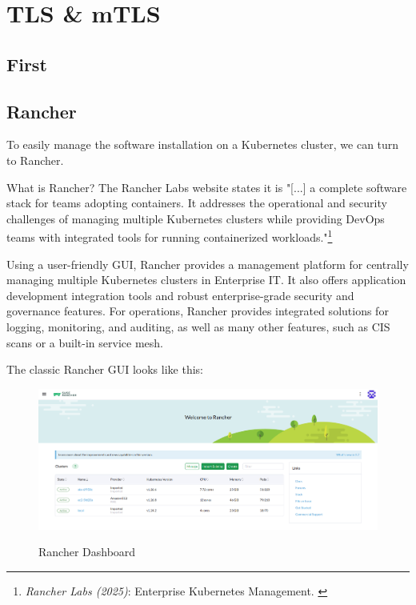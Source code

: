 %
%

\pagebreak
\section{TLS \& mTLS}

\onehalfspacing

\subsection{First}

\subsection{Rancher}

To easily manage the software installation on a Kubernetes cluster, we can turn to Rancher.

What is Rancher? The Rancher Labs website states it is "[...] a complete software stack for teams adopting containers. It addresses the operational and security challenges of managing multiple Kubernetes clusters while providing DevOps teams with integrated tools for running containerized workloads."\footnote{\textit{Rancher Labs (2025)}: Enterprise Kubernetes Management. \cite{rancher}}

Using a user-friendly GUI, Rancher provides a management platform for centrally managing multiple Kubernetes clusters in Enterprise IT. It also offers application development integration tools and robust enterprise-grade security and governance features. For operations, Rancher provides integrated solutions for logging, monitoring, and auditing, as well as many other features, such as CIS scans or a built-in service mesh.

The classic Rancher GUI looks like this:

\begin{figure}[H]
\centering
\caption {Rancher Dashboard}
\includegraphics[width=\linewidth]{images/rancher-dashboard.png}
\label{fig:rancherDashboard}
\end{figure}

